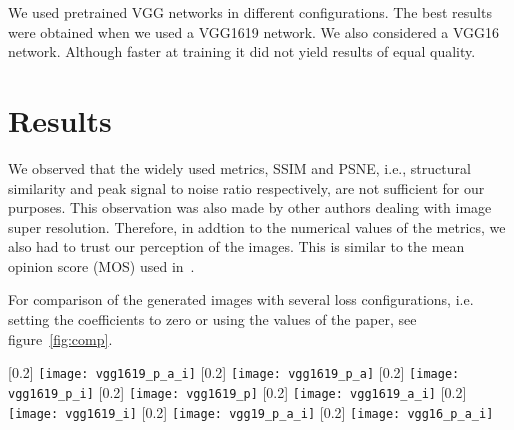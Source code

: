 \documentclass[10pt,twocolumn,letterpaper]{article}
\begin{document}
We used pretrained VGG networks in different configurations. The best
results were obtained when we used a VGG1619 network. We also
considered a VGG16 network. Although faster at training it did not
yield results of equal quality.


\section{Results}
\label{sec:results}


We observed that the widely used metrics, SSIM and PSNE, i.\;e.,
structural similarity and peak signal to noise ratio respectively, are
not sufficient for our purposes. This observation was also made by
other authors dealing with image super resolution. Therefore, in
addtion to the numerical values of the metrics, we also had to trust
our perception of the images. This is similar to the mean opinion
score (MOS) used in~\cite{LedigChristian2016PSIS}.

For comparison of the generated images with several loss
configurations, i.e. setting the coefficients to zero or using the
values of the paper, see figure~\ref{fig:comp}.
\begin{figure*}[h]
  \centering
  [0.2\linewidth]{%
    \texttt{[image: vgg1619\_p\_a\_i]}
  }
  [0.2\linewidth]{%
    \texttt{[image: vgg1619\_p\_a]}
  }
  [0.2\linewidth]{%
    \texttt{[image: vgg1619\_p\_i]}
  }
  [0.2\linewidth]{%
    \texttt{[image: vgg1619\_p]}
  }
  [0.2\linewidth]{%
    \texttt{[image: vgg1619\_a\_i]}
  }
  [0.2\linewidth]{%
    \texttt{[image: vgg1619\_i]}
  }
  [0.2\linewidth]{%
    \texttt{[image: vgg19\_p\_a\_i]}
  }
  [0.2\linewidth]{%
    \texttt{[image: vgg16\_p\_a\_i]}
  }
  \label{fig:comp}
  \caption{Comparison of several loss configurations}
\end{figure*}
\end{document}
